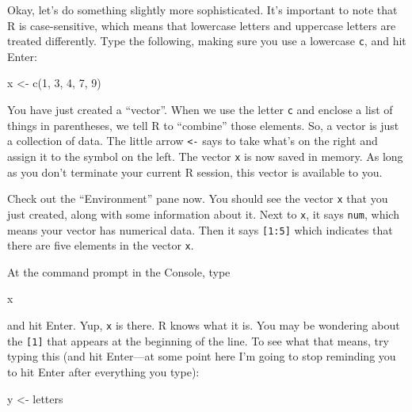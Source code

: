 \documentclass[
]{book}
\newenvironment{Shaded}{\begin{snugshade}}{\end{snugshade}}
\newcommand{\DecValTok}[1]{\textcolor[rgb]{0.00,0.00,0.81}{#1}}
\newcommand{\FunctionTok}[1]{\textcolor[rgb]{0.00,0.00,0.00}{#1}}
\newcommand{\NormalTok}[1]{#1}
\newcommand{\OtherTok}[1]{\textcolor[rgb]{0.56,0.35,0.01}{#1}}
\begin{document}
Okay, let's do something slightly more sophisticated. It's important to note that R is case-sensitive, which means that lowercase letters and uppercase letters are treated differently. Type the following, making sure you use a lowercase \texttt{c}, and hit Enter:

\begin{Shaded}
\begin{Highlighting}[]
\NormalTok{x }\OtherTok{\textless{}{-}} \FunctionTok{c}\NormalTok{(}\DecValTok{1}\NormalTok{, }\DecValTok{3}\NormalTok{, }\DecValTok{4}\NormalTok{, }\DecValTok{7}\NormalTok{, }\DecValTok{9}\NormalTok{)}
\end{Highlighting}
\end{Shaded}

You have just created a ``vector''. When we use the letter \texttt{c} and enclose a list of things in parentheses, we tell R to ``combine'' those elements. So, a vector is just a collection of data. The little arrow \texttt{\textless{}-} says to take what's on the right and assign it to the symbol on the left. The vector \texttt{x} is now saved in memory. As long as you don't terminate your current R session, this vector is available to you.

Check out the ``Environment'' pane now. You should see the vector \texttt{x} that you just created, along with some information about it. Next to \texttt{x}, it says \texttt{num}, which means your vector has numerical data. Then it says \texttt{{[}1:5{]}} which indicates that there are five elements in the vector \texttt{x}.

At the command prompt in the Console, type

\begin{Shaded}
\begin{Highlighting}[]
\NormalTok{x}
\end{Highlighting}
\end{Shaded}

and hit Enter. Yup, \texttt{x} is there. R knows what it is. You may be wondering about the \texttt{{[}1{]}} that appears at the beginning of the line. To see what that means, try typing this (and hit Enter---at some point here I'm going to stop reminding you to hit Enter after everything you type):

\begin{Shaded}
\begin{Highlighting}[]
\NormalTok{y }\OtherTok{\textless{}{-}}\NormalTok{ letters}
\end{Highlighting}
\end{Shaded}
\end{document}

